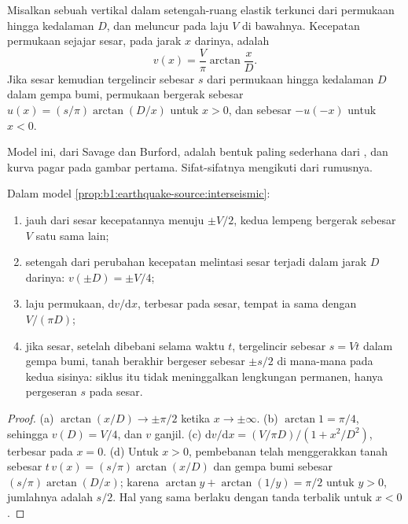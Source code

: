 \begin{proposition}\label{prop:b1:earthquake-source:interseismic}
Misalkan sebuah  vertikal dalam setengah-ruang elastik terkunci dari permukaan hingga kedalaman $D$, dan meluncur pada laju $V$ di bawahnya. Kecepatan permukaan sejajar sesar, pada jarak $x$ darinya, adalah
\[
  v(x) = \frac{V}{\pi}\arctan\frac{x}{D} .
\]
Jika sesar kemudian tergelincir sebesar $s$ dari permukaan hingga kedalaman $D$ dalam gempa bumi, permukaan bergerak sebesar $u(x) = (s/\pi)\arctan(D/x)$ untuk $x > 0$, dan sebesar $-u(-x)$ untuk $x < 0$.
\end{proposition}
\admitted

Model ini, dari Savage dan Burford, adalah bentuk paling sederhana dari , dan kurva pagar pada gambar pertama. Sifat-sifatnya mengikuti dari rumusnya.

\begin{proposition}\label{prop:b1:earthquake-source:profile}
Dalam model \cref{prop:b1:earthquake-source:interseismic}:
\begin{enumerate}[label=(\alph*)]
  \item jauh dari sesar kecepatannya menuju $\pm V/2$, kedua lempeng bergerak sebesar $V$ satu sama lain;
  \item setengah dari perubahan kecepatan melintasi sesar terjadi dalam jarak $D$ darinya: $v(\pm D) = \pm V/4$;
  \item laju  permukaan, $\mathrm dv/\mathrm dx$, terbesar pada sesar, tempat ia sama dengan $V/(\pi D)$;
  \item jika sesar, setelah dibebani selama waktu $t$, tergelincir sebesar $s = Vt$ dalam gempa bumi, tanah berakhir bergeser sebesar $\pm s/2$ di mana-mana pada kedua sisinya: siklus itu tidak meninggalkan lengkungan permanen, hanya pergeseran $s$ pada sesar.
\end{enumerate}
\end{proposition}

\begin{proof}
(a) $\arctan(x/D) \to \pm\pi/2$ ketika $x \to \pm\infty$. (b) $\arctan 1 = \pi/4$, sehingga $v(D) = V/4$, dan $v$ ganjil. (c) $\mathrm dv/\mathrm dx = (V/\pi D)/(1 +
x^2/D^2)$, terbesar pada $x = 0$. (d) Untuk $x > 0$, pembebanan telah menggerakkan tanah sebesar $t\,v(x) = (s/\pi)\arctan(x/D)$ dan gempa bumi sebesar $(s/\pi)\arctan(D/x)$; karena $\arctan y + \arctan(1/y) = \pi/2$ untuk $y > 0$, jumlahnya adalah $s/2$. Hal yang sama berlaku dengan tanda terbalik untuk $x < 0$.
\end{proof}

